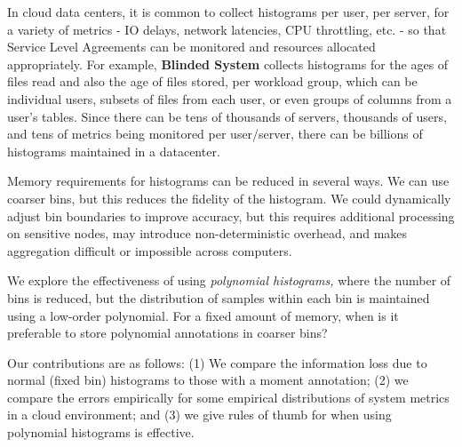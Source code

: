 \documentclass[preprint]{sig-alternate-per}
\begin{document}

In cloud data centers, it is common to collect histograms per user,
per server, for a variety of metrics - IO delays, network latencies,
CPU throttling, etc. - so that Service Level Agreements can be
monitored and resources allocated appropriately.  For example,
\textbf{Blinded System}
collects histograms for the ages of files read and also the age of files
stored, per workload group, which can be individual users, subsets of
files from each user, or even groups of columns from a user's
tables. Since there can be tens of thousands of servers, thousands of
users, and tens of metrics being monitored per user/server, there can
be billions of histograms maintained in a datacenter.

Memory requirements for histograms can be reduced in several ways.
We can use coarser bins, but this reduces the fidelity of the histogram. We
could dynamically adjust bin boundaries to improve accuracy, but
this requires additional processing on sensitive nodes, may introduce
non-deterministic overhead, and makes aggregation difficult or impossible across
computers.


We explore the effectiveness of using {\em polynomial
  histograms,} where the number of bins is reduced, but the
distribution of samples within each bin is maintained using a
low-order polynomial. For a fixed amount of memory, when is it
preferable to store polynomial annotations in coarser bins?

Our contributions are as follows: (1) We compare the information loss
due to normal (fixed bin) histograms to those with a moment annotation;
(2) we compare the errors empirically for some empirical distributions of system metrics
in a cloud environment; and (3) we give rules of thumb for when
using polynomial histograms is effective.
\end{document}
